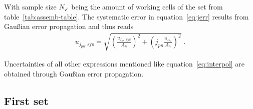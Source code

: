 With sample size $N_\checkmark$ being the amount of working cells of the set from table~\ref{tab:assemb-table}. The systematic error in equation~\ref{eq:jerr} results from Gaußian error propagation and thus reads
\begin{align}
u_{j_{pn},\text{sys}} = \sqrt{ \left( \frac{ u_{I_{pn},\text{sys}}}{A_n}\right)^2+\left(j_{pn}\frac{u_{A_n}}{A_n} \right)^2}\;.
\end{align}

Uncertainties of all other expressions mentioned like equation~\ref{eq:interpol} are obtained through Gaußian error propagation.

\subsection{First set}\label{subsec:S1data}

